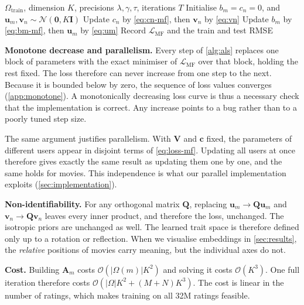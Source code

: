 \documentclass{article}
\theoremstyle{plain}
\theoremstyle{definition}
\theoremstyle{remark}
\begin{document}
\begin{algorithm}[tb]
  \caption{ALS for biased matrix factorisation}
  \label{alg:als}
\begin{algorithmic}
   $\Omega_{\text{train}}$, dimension $K$,
         precisions $\lambda, \gamma, \tau$, iterations $T$
  \STATE Initialise $b_m = c_n = 0$, and
         $\mathbf{u}_m, \mathbf{v}_n \sim \mathcal{N}(\mathbf{0}, K \mathbf{I})$
      \STATE Update $c_n$ by \cref{eq:cn-mf}, then $\mathbf{v}_n$ by \cref{eq:vn}
    \ENDFOR
      \STATE Update $b_m$ by \cref{eq:bm-mf}, then $\mathbf{u}_m$ by \cref{eq:um}
    \ENDFOR
    \STATE Record $\mathcal{L}_{\text{MF}}$ and the train and test RMSE
  \ENDFOR
\end{algorithmic}
\end{algorithm}

\textbf{Monotone decrease and parallelism.}
Every step of \cref{alg:als} replaces one block of parameters with the exact
minimiser of $\mathcal{L}_{\text{MF}}$ over that block, holding the rest
fixed. The loss therefore can never increase from one step to the next.
Because it is bounded below by zero, the sequence of loss values converges
(\cref{app:monotone}). A monotonically decreasing loss curve is thus a
necessary check that the implementation is correct. Any increase points to
a bug rather than to a poorly tuned step size.

The same argument justifies parallelism. With $\mathbf{V}$ and $\mathbf{c}$
fixed, the parameters of different users appear in disjoint terms of
\cref{eq:loss-mf}. Updating all users at once therefore gives exactly the
same result as updating them one by one, and the same holds for movies.
This independence is what our parallel implementation exploits
(\cref{sec:implementation}).

\textbf{Non-identifiability.}
For any orthogonal matrix $\mathbf{Q}$, replacing
$\mathbf{u}_m \to \mathbf{Q}\mathbf{u}_m$ and
$\mathbf{v}_n \to \mathbf{Q}\mathbf{v}_n$ leaves every inner product, and
therefore the loss, unchanged. The isotropic priors are unchanged as well.
The learned trait space is therefore defined only up to a rotation or
reflection. When we visualise embeddings in \cref{sec:results}, the
\emph{relative} positions of movies carry meaning, but the individual axes
do not.

\textbf{Cost.}
Building $\mathbf{A}_m$ costs $\mathcal{O}(|\Omega(m)| K^2)$ and solving it
costs $\mathcal{O}(K^3)$. One full iteration therefore costs
$\mathcal{O}(|\Omega| K^2 + (M+N) K^3)$. The cost is linear in the number of
ratings, which makes training on all 32M ratings feasible.
\end{document}
